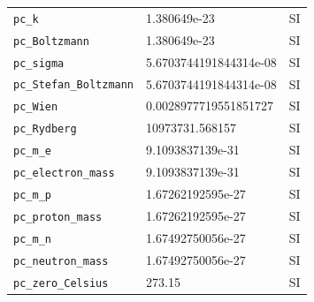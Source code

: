 \begin{tabular}{lll}
{\tt pc\_k} \index{pc\_k}  & 1.380649e-23 & SI \\
{\tt pc\_Boltzmann} \index{pc\_Boltzmann}  & 1.380649e-23 & SI \\
{\tt pc\_sigma} \index{pc\_sigma}  & 5.6703744191844314e-08 & SI \\
{\tt pc\_Stefan\_Boltzmann} \index{pc\_Stefan\_Boltzmann}  & 5.6703744191844314e-08 & SI \\
{\tt pc\_Wien} \index{pc\_Wien}  & 0.0028977719551851727 & SI \\
{\tt pc\_Rydberg} \index{pc\_Rydberg}  & 10973731.568157 & SI \\
{\tt pc\_m\_e} \index{pc\_m\_e}  & 9.1093837139e-31 & SI \\
{\tt pc\_electron\_mass} \index{pc\_electron\_mass}  & 9.1093837139e-31 & SI \\
{\tt pc\_m\_p} \index{pc\_m\_p}  & 1.67262192595e-27 & SI \\
{\tt pc\_proton\_mass} \index{pc\_proton\_mass}  & 1.67262192595e-27 & SI \\
{\tt pc\_m\_n} \index{pc\_m\_n}  & 1.67492750056e-27 & SI \\
{\tt pc\_neutron\_mass} \index{pc\_neutron\_mass}  & 1.67492750056e-27 & SI \\
{\tt pc\_zero\_Celsius} \index{pc\_zero\_Celsius}  & 273.15 & SI \\
\end{tabular}
